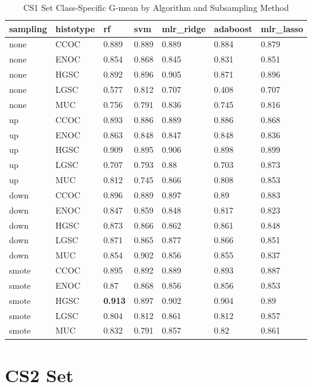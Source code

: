 \documentclass[
]{report}
\begin{document}
\begin{table}

\caption{\label{tab:cs1-gmean-class-table}CS1 Set Class-Specific G-mean by Algorithm and Subsampling Method}
\centering
\begin{tabular}[t]{l|l|l|l|l|l|l}
\hline
sampling & histotype & rf & svm & mlr\_ridge & adaboost & mlr\_lasso\\
\hline
none & CCOC & 0.889 & 0.889 & 0.889 & 0.884 & 0.879\\
\hline
none & ENOC & 0.854 & 0.868 & 0.845 & 0.831 & 0.851\\
\hline
none & HGSC & 0.892 & 0.896 & 0.905 & 0.871 & 0.896\\
\hline
none & LGSC & 0.577 & 0.812 & 0.707 & 0.408 & 0.707\\
\hline
none & MUC & 0.756 & 0.791 & 0.836 & 0.745 & 0.816\\
\hline
up & CCOC & 0.893 & 0.886 & 0.889 & 0.886 & 0.868\\
\hline
up & ENOC & 0.863 & 0.848 & 0.847 & 0.848 & 0.836\\
\hline
up & HGSC & 0.909 & 0.895 & 0.906 & 0.898 & 0.899\\
\hline
up & LGSC & 0.707 & 0.793 & 0.88 & 0.703 & 0.873\\
\hline
up & MUC & 0.812 & 0.745 & 0.866 & 0.808 & 0.853\\
\hline
down & CCOC & 0.896 & 0.889 & 0.897 & 0.89 & 0.883\\
\hline
down & ENOC & 0.847 & 0.859 & 0.848 & 0.817 & 0.823\\
\hline
down & HGSC & 0.873 & 0.866 & 0.862 & 0.861 & 0.848\\
\hline
down & LGSC & 0.871 & 0.865 & 0.877 & 0.866 & 0.851\\
\hline
down & MUC & 0.854 & 0.902 & 0.856 & 0.855 & 0.837\\
\hline
smote & CCOC & 0.895 & 0.892 & 0.889 & 0.893 & 0.887\\
\hline
smote & ENOC & 0.87 & 0.868 & 0.856 & 0.856 & 0.853\\
\hline
smote & HGSC & \textbf{0.913} & 0.897 & 0.902 & 0.904 & 0.89\\
\hline
smote & LGSC & 0.804 & 0.812 & 0.861 & 0.812 & 0.857\\
\hline
smote & MUC & 0.832 & 0.791 & 0.857 & 0.82 & 0.861\\
\hline
\end{tabular}
\end{table}

\hypertarget{cs2-set}{%
\section{CS2 Set}\label{cs2-set}}
\end{document}
